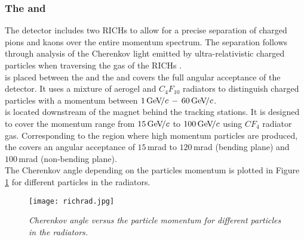 \subsubsection{The \richone and \richtwo}
The \lhcb detector includes two RICHs \cite{rich} to allow for a precise separation of charged pions and kaons over the entire momentum spectrum. The separation follows through analysis of the Cherenkov light emitted by ultra-relativistic charged particles when traversing the gas of the RICHs \cite{WRLeo}.\\
\richone is placed between the \velo and the \ttracker and covers the full angular acceptance of the \lhcb detector. It uses a mixture of aerogel and $C_4F_{10}$ radiators to distinguish charged particles with a momentum between $1 {\mathrm{\,Ge\kern -0.1em V\!/}c} \, - \, 60{\mathrm{\,Ge\kern -0.1em V\!/}c}$.\\
\richtwo is located downstream of the magnet behind the tracking stations. It is designed to cover the momentum range from $15{\mathrm{\,Ge\kern -0.1em V\!/}c}$ to $100{\mathrm{\,Ge\kern -0.1em V\!/}c}$ using $CF_4$ radiator gas. Corresponding to the region where high momentum particles are produced, the \richtwo covers an angular acceptance of $15\,$mrad to $120\,$mrad (bending plane) and $100\,$mrad (non-bending plane).\\
The Cherenkov angle depending on the particles momentum is plotted in Figure \ref{fig:richrad} for different particles in the \rich radiators.
\begin{figure}[ht]
  \begin{center}
  	\vspace*{-0.5cm}
    \texttt{[image: richrad.jpg]}
  \vspace*{-0.8cm}
  \end{center}
  \caption{\textit{Cherenkov angle versus the particle momentum for different particles in the \rich radiators.}\cite{rich}}
  \label{fig:richrad}
  \vspace*{-0.5cm}
\end{figure}

